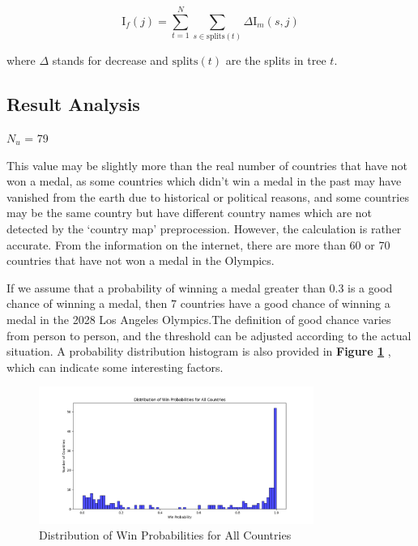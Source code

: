 $$\text{I}_{f}(j) = \sum_{t=1}^{N} \sum_{s \in \text{splits}(t)} \Delta \text{I}_{m}(s,j)  $$

where $\Delta$ stands for decrease and $\text{splits}(t)$ are the splits in tree $t$.

\subsection{Result Analysis}
\begin{center}
    $N_u$ = 79
\end{center}

This value may be slightly more than the real number of countries that have not won a medal, as some countries which didn't win a medal in the past may have vanished from the earth due to historical or political reasons, and some countries may be the same country but have different country names which are not detected by the `country map' preprocession. However, the calculation is rather accurate. From the information on the internet, there are more than 60 or 70 countries that have not won a medal in the Olympics.

If we assume that a probability of winning a medal greater than 0.3 is a good chance of winning a medal, then 7 countries have a good chance of winning a medal in the 2028 Los Angeles Olympics.The definition of good chance varies from person to person, and the threshold can be adjusted according to the actual situation. A probability distribution histogram is also provided in \textbf{Figure \ref{fig:win_probability_distribution}} , which can indicate some interesting factors.


\begin{figure}[h]
    \centering
    \includegraphics[width=0.8\textwidth]{../figures/win_probability_distribution.png}
    \caption{Distribution of Win Probabilities for All Countries}
    \label{fig:win_probability_distribution}
\end{figure}

